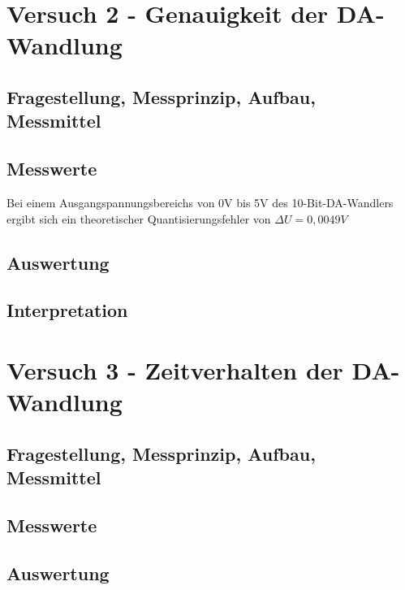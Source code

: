 \documentclass[12pt,oneside,a4paper]{report}
\begin{document}
%
%
\chapter{Versuch 2 - Genauigkeit der DA-Wandlung}
\label{chap:VERSUCH_2}


\section{Fragestellung, Messprinzip, Aufbau, Messmittel}
\label{chap:VERSUCH_2_FRAGESTELLUNG}

\section{Messwerte}
\label{chap:VERSUCH_2_MESSWERTE}
Bei einem Ausgangspannungsbereichs von 0V bis 5V des 10-Bit-DA-Wandlers ergibt sich ein theoretischer Quantisierungsfehler von $\Delta U = 0,0049 V$

\section{Auswertung}
\label{chap:VERSUCH_2_AUSWERTUNG}

\section{Interpretation}
\label{chap:VERSUCH_2_INTERPRETATION}

%
%
\chapter{Versuch 3 - Zeitverhalten der DA-Wandlung}
\label{chap:VERSUCH_3}

\section{Fragestellung, Messprinzip, Aufbau, Messmittel}
\label{chap:VERSUCH_3_FRAGESTELLUNG}

\section{Messwerte}
\label{chap:VERSUCH_3_MESSWERTE}

\section{Auswertung}
\label{chap:VERSUCH_3_AUSWERTUNG}
\end{document}
